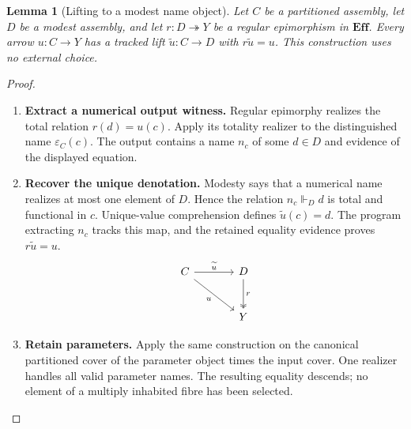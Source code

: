 \documentclass[11pt,a4paper]{article}
\numberwithin{algorithm}{section}
\numberwithin{equation}{section}
\newtheorem{lemma}[lemma]{Lemma}
\theoremstyle{definition}
\theoremstyle{remark}
\theoremstyle{plain}
\newcommand{\Eff}{\mathbf{Eff}}
\newcommand{\onto}{\twoheadrightarrow}
\theoremstyle{definition}
\theoremstyle{plain}
\begin{document}
\begin{lemma}[Lifting to a modest name object]
\label{lem:modest-target-lifting}
Let $C$ be a partitioned assembly, let $D$ be a modest assembly,
and let $r:D\onto Y$ be a regular epimorphism in $\Eff$.
Every arrow $u:C\to Y$ has a tracked lift
$\widetilde u:C\to D$ with $r\widetilde u=u$.
This construction uses no external choice.
\end{lemma}
\begin{proof}\leavevmode
\begin{enumerate}[leftmargin=*,align=left]
\item \textbf{Extract a numerical output witness.}
Regular epimorphy realizes the total relation $r(d)=u(c)$.
Apply its totality realizer to the distinguished name
$\varepsilon_C(c)$. The output contains a name $n_c$ of some
$d\in D$ and evidence of the displayed equation.

\item \textbf{Recover the unique denotation.}
Modesty says that a numerical name realizes at most one element of
$D$. Hence the relation $n_c\Vdash_D d$ is total and functional
in $c$. Unique-value comprehension defines $\widetilde u(c)=d$.
The program extracting $n_c$ tracks this map, and the retained
equality evidence proves $r\widetilde u=u$.
\[
\begin{tikzcd}[column sep=large,row sep=large]
C \arrow[r,"\widetilde u"] \arrow[dr,"u"'] &
D \arrow[d,two heads,"r"]\\
&Y
\end{tikzcd}
\]

\item \textbf{Retain parameters.}
Apply the same construction on the canonical partitioned cover of
the parameter object times the input cover. One realizer handles all
valid parameter names. The resulting equality descends; no element
of a multiply inhabited fibre has been selected.
\end{enumerate}
\end{proof}
\end{document}
